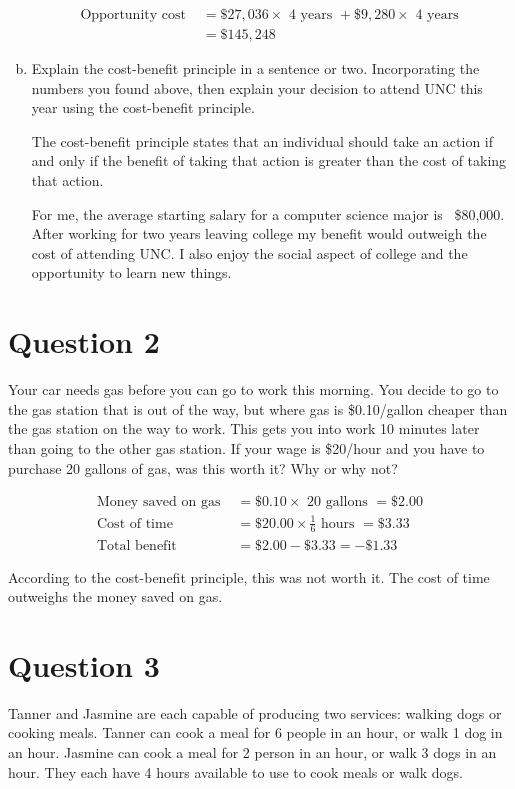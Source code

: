 \documentclass{article}
\newcommand{\question}[1]{\pagebreak\section{Question #1}}
\begin{document}
\begin{enumerate}[(a)]
    \begin{align*}
        \text{Opportunity cost } &= \$27,036 \times \text{ 4 years } + \$9,280 \times \text{ 4 years }\\
        &= \$145,248
    \end{align*}

    \item Explain the cost-benefit principle in a sentence or two. Incorporating the numbers you found above, then explain your decision
    to attend UNC this year using the cost-benefit principle.

    The cost-benefit principle states that an individual should take an action if and only if the benefit of taking that action is greater than the cost of taking that action.

    For me, the average starting salary for a computer science major is ~\$80,000. After working for two years leaving college my benefit would outweigh the cost of attending UNC. I also enjoy the social aspect of college and the opportunity to learn new things. 

\end{enumerate}

\question{2} Your car needs gas before you can go to work this morning. You
decide to go to the gas station that is out of the way, but where gas
is \$0.10/gallon cheaper than the gas station on the way to work. This
gets you into work 10 minutes later than going to the other gas station.
If your wage is \$20/hour and you have to purchase 20 gallons of gas,
was this worth it? Why or why not?

\begin{align*}
    \text{Money saved on gas } &= \$0.10 \times \text{ 20 gallons } = \$2.00\\
    \text{Cost of time } &= \$20.00 \times \frac{1}{6} \text{ hours } = \$3.33\\
    \text{Total benefit } &= \$2.00 - \$3.33 = -\$1.33
\end{align*}

According to the cost-benefit principle, this was not worth it. The cost of time outweighs the money saved on gas.

\question{3} Tanner and Jasmine are each capable of producing two services: walking dogs or cooking meals. Tanner can cook a meal for 6 people in
an hour, or walk 1 dog in an hour. Jasmine can cook a meal for 2
person in an hour, or walk 3 dogs in an hour. They each have 4 hours
available to use to cook meals or walk dogs.
\end{document}
